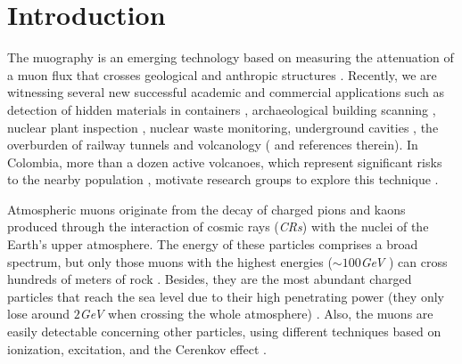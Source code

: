 \documentclass[submitting]{nst}
\begin{document}
\maketitle
\section{Introduction}\label{sec:introduction}
The muography is an emerging technology based on measuring the attenuation of a muon flux that crosses geological and anthropic structures \cite{Kaiser2019}. Recently, we are witnessing several new successful academic and commercial applications such as detection of hidden materials in containers \cite{BlanpiedEtal2015}, archaeological building scanning \cite{MorishimaEtal2017, GomezEtal2016}, nuclear plant inspection \cite{FujiiEtal2013}, nuclear waste monitoring, underground cavities \cite{SaracinoEtal2017}, the overburden of railway tunnels \cite{ThompsonEtal2019} and volcanology (\cite{TanakaOlah2019} and references therein). In Colombia, more than a dozen active volcanoes, which represent significant risks to the nearby population \cite{Cortes2016, Agudelo2016, Munoz2017}, motivate research groups to explore this technique \cite{AsoreyEtal2017B, SierraPortaEtal2018, PenaRodriguezEtal2018, GuerreroEtal2019, ParraAvila2019}.  

Atmospheric muons originate from the decay of charged pions and kaons produced through the interaction of cosmic rays (\textsl{CRs}) with the nuclei of the Earth's upper atmosphere. The energy of these particles comprises a broad spectrum, but only those muons with the highest energies ($\sim 100$\textsl{GeV}  ) can cross hundreds of meters of rock \cite{MarteauEtal2012}. Besides, they are the most abundant charged particles that reach the sea level due to their high penetrating power (they only lose around $2$\textsl{GeV}   when crossing the whole atmosphere) \cite{MarteauEtal2012}. Also, the muons are easily detectable concerning other particles, using different techniques based on ionization, excitation, and the Cerenkov effect \cite{MarteauEtal2012}. 
\end{document}
